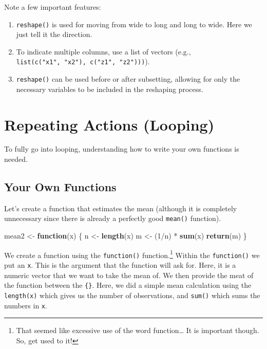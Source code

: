 \documentclass[]{tufte-book}
\newenvironment{Shaded}{}{}
\newcommand{\KeywordTok}[1]{\textcolor[rgb]{0.00,0.44,0.13}{\textbf{#1}}}
\newcommand{\DecValTok}[1]{\textcolor[rgb]{0.25,0.63,0.44}{#1}}
\newcommand{\StringTok}[1]{\textcolor[rgb]{0.25,0.44,0.63}{#1}}
\newcommand{\ControlFlowTok}[1]{\textcolor[rgb]{0.00,0.44,0.13}{\textbf{#1}}}
\newcommand{\OperatorTok}[1]{\textcolor[rgb]{0.40,0.40,0.40}{#1}}
\newcommand{\NormalTok}[1]{#1}
\providecommand{\tightlist}{%
  \setlength{\itemsep}{0pt}\setlength{\parskip}{0pt}}
\theoremstyle{definition}
\theoremstyle{definition}
\theoremstyle{remark}
\begin{document}
Note a few important features:

\begin{enumerate}
\def\labelenumi{\arabic{enumi}.}
\tightlist
\item
  \texttt{reshape()} is used for moving from wide to long and long to
  wide. Here we just tell it the direction.
\item
  To indicate multiple columns, use a list of vectors (e.g.,
  \texttt{list(c("x1",\ "x2"),\ c("z1",\ "z2")))}).
\item
  \texttt{reshape()} can be used before or after subsetting, allowing
  for only the necessary variables to be included in the reshaping
  process.
\end{enumerate}

\section*{Repeating Actions (Looping)}\label{repeating-actions-looping}

To fully go into looping, understanding how to write your own functions
is needed.

\subsection*{Your Own Functions}\label{your-own-functions}

Let's create a function that estimates the mean (although it is
completely unnecessary since there is already a perfectly good
\texttt{mean()} function).

\begin{Shaded}
\begin{Highlighting}[]
\NormalTok{mean2 <-}\StringTok{ }\ControlFlowTok{function}\NormalTok{(x) \{}
\NormalTok{    n <-}\StringTok{ }\KeywordTok{length}\NormalTok{(x)}
\NormalTok{    m <-}\StringTok{ }\NormalTok{(}\DecValTok{1}\OperatorTok{/}\NormalTok{n) }\OperatorTok{*}\StringTok{ }\KeywordTok{sum}\NormalTok{(x)}
    \KeywordTok{return}\NormalTok{(m)}
\NormalTok{\}}
\end{Highlighting}
\end{Shaded}

We create a function using the \texttt{function()} function.\footnote{That
  seemed like excessive use of the word function\ldots{} It is important
  though. So, get used to it!} Within the \texttt{function()} we put an
\texttt{x}. This is the argument that the function will ask for. Here,
it is a numeric vector that we want to take the mean of. We then provide
the meat of the function between the \texttt{\{\}}. Here, we did a
simple mean calculation using the \texttt{length(x)} which gives us the
number of observations, and \texttt{sum()} which sums the numbers in
\texttt{x}.
\end{document}
